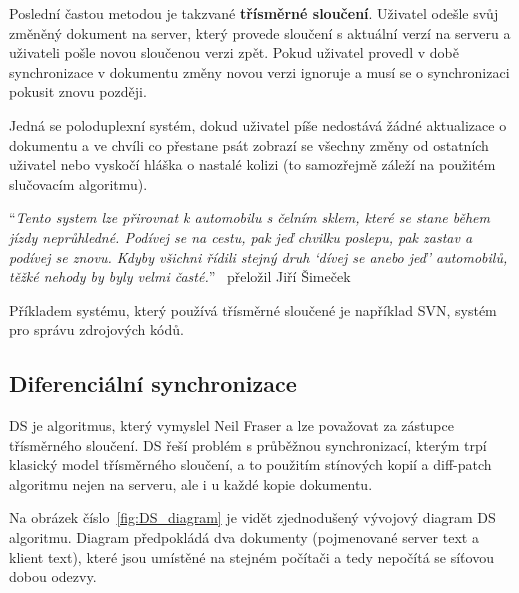 Poslední častou metodou je takzvané \textbf{třísměrné sloučení}.
Uživatel odešle svůj změněný dokument na server, který provede sloučení s aktuální verzí na serveru a uživateli pošle novou sloučenou verzi zpět.
Pokud uživatel provedl v době synchronizace v dokumentu změny novou verzi ignoruje a musí se o synchronizaci pokusit znovu později.

Jedná se poloduplexní systém, dokud uživatel píše nedostává žádné aktualizace o dokumentu a ve chvíli co přestane psát zobrazí se všechny změny od ostatních uživatel nebo vyskočí hláška o nastalé kolizi (to samozřejmě záleží na použitém slučovacím algoritmu).~\cite{ds:neil_paper}~\cite{ds:neil_video}

\enquote{\textit{Tento system lze přirovnat k automobilu s čelním sklem, které se stane během jízdy neprůhledné.
Podívej se na cestu, pak jeď chvilku poslepu, pak zastav a podívej se znovu.
Kdyby všichni řídili stejný druh \enquote{dívej se anebo jeď} automobilů, těžké nehody by byly velmi časté.}}~\cite{ds:neil_paper} přeložil Jiří Šimeček

Příkladem systému, který používá třísměrné sloučené je například \gls{SVN}, systém pro správu zdrojových kódů.

\subsection{Diferenciální synchronizace}\label{subsec:diferencialniSynchronizace}

\gls{DS} je algoritmus, který vymyslel Neil Fraser a lze považovat za zástupce třísměrného sloučení.
\gls{DS} řeší problém s průběžnou synchronizací, kterým trpí klasický model třísměrného sloučení, a to použitím stínových kopií a diff-patch algoritmu nejen na serveru, ale i u každé kopie dokumentu.

Na obrázek číslo~\ref{fig:DS_diagram} je vidět zjednodušený vývojový diagram \gls{DS} algoritmu.
Diagram předpokládá dva dokumenty (pojmenované server text a klient text), které jsou umístěné na stejném počítači a tedy nepočítá se síťovou dobou odezvy.

